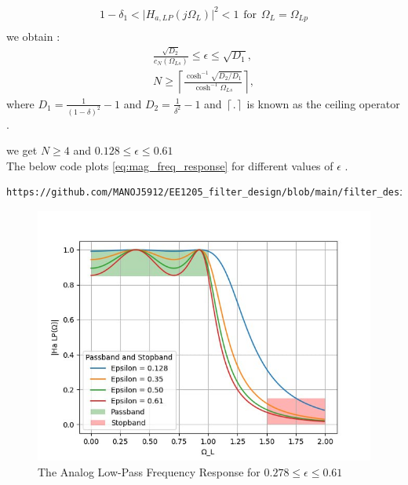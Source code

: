\documentclass{article}
\begin{document}
\begin{enumerate}
\begin{align}
              1-\delta_{1}<\vert H_{a,LP}(j\Omega_L)\vert^2 < 1 \hspace{5pt} \text{for}\hspace{5pt} \Omega_L = \Omega_{Lp} \\
          \end{align}
          we obtain :
          \begin{eqnarray}
              \label{lpdesign}
              \frac{\sqrt{D_2}}{c_N(\Omega_{Ls})} \leq \epsilon \leq \sqrt{D_1}, \nonumber \\
              N \geq \left\lceil \frac{\cosh^{-1}\sqrt{D_2/D_1}}{\cosh^{-1}\Omega_{Ls}} \right\rceil,
          \end{eqnarray}
          where $D_1 = \frac{1}{(1 - \delta)^2}-1$ and $D_2 = \frac{1}{\delta^2} - 1$ and $\left \lceil . \right \rceil$ is known as the ceiling operator . 
          
          we get $N\geq4$ and $0.128 \leq \epsilon \leq 0.61$ \\
          \newpage
          The below code plots \eqref{eq:mag_freq_response} for different values of $\epsilon$ .
          \begin{lstlisting}
https://github.com/MANOJ5912/EE1205_filter_design/blob/main/filter_design/codes/plot1.py
\end{lstlisting}
 \begin{figure}[H]
  \centering
  \includegraphics[width=1\columnwidth]{figs/plot1.png}
  \caption{The Analog Low-Pass Frequency Response for $0.278  \leq \epsilon \leq 0.61$}
 \label{fig:H_for_diff_eb}
 \end{figure}
          

\end{enumerate}
\end{document}
